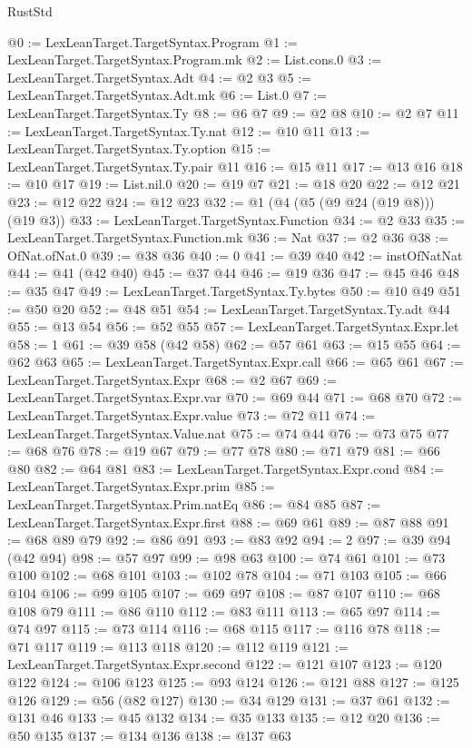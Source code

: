 \begin{lexlean}{RustStd}
\begin{coremodule}
{\begin{coremodule}
{{{{{{{{{{{{{{{{{{{{{{{{{{{{{{{{{@0 := LexLeanTarget.TargetSyntax.Program
@1 := LexLeanTarget.TargetSyntax.Program.mk
@2 := List.cons.{0}
@3 := LexLeanTarget.TargetSyntax.Adt
@4 := @2 @3
@5 := LexLeanTarget.TargetSyntax.Adt.mk
@6 := List.{0}
@7 := LexLeanTarget.TargetSyntax.Ty
@8 := @6 @7
@9 := @2 @8
@10 := @2 @7
@11 := LexLeanTarget.TargetSyntax.Ty.nat
@12 := @10 @11
@13 := LexLeanTarget.TargetSyntax.Ty.option
@15 := LexLeanTarget.TargetSyntax.Ty.pair @11
@16 := @15 @11
@17 := @13 @16
@18 := @10 @17
@19 := List.nil.{0}
@20 := @19 @7
@21 := @18 @20
@22 := @12 @21
@23 := @12 @22
@24 := @12 @23
@32 := @1 (@4 (@5 (@9 @24 (@19 @8))) (@19 @3))
@33 := LexLeanTarget.TargetSyntax.Function
@34 := @2 @33
@35 := LexLeanTarget.TargetSyntax.Function.mk
@36 := Nat
@37 := @2 @36
@38 := OfNat.ofNat.{0}
@39 := @38 @36
@40 := 0
@41 := @39 @40
@42 := instOfNatNat
@44 := @41 (@42 @40)
@45 := @37 @44
@46 := @19 @36
@47 := @45 @46
@48 := @35 @47
@49 := LexLeanTarget.TargetSyntax.Ty.bytes
@50 := @10 @49
@51 := @50 @20
@52 := @48 @51
@54 := LexLeanTarget.TargetSyntax.Ty.adt @44
@55 := @13 @54
@56 := @52 @55
@57 := LexLeanTarget.TargetSyntax.Expr.let
@58 := 1
@61 := @39 @58 (@42 @58)
@62 := @57 @61
@63 := @15 @55
@64 := @62 @63
@65 := LexLeanTarget.TargetSyntax.Expr.call
@66 := @65 @61
@67 := LexLeanTarget.TargetSyntax.Expr
@68 := @2 @67
@69 := LexLeanTarget.TargetSyntax.Expr.var
@70 := @69 @44
@71 := @68 @70
@72 := LexLeanTarget.TargetSyntax.Expr.value
@73 := @72 @11
@74 := LexLeanTarget.TargetSyntax.Value.nat
@75 := @74 @44
@76 := @73 @75
@77 := @68 @76
@78 := @19 @67
@79 := @77 @78
@80 := @71 @79
@81 := @66 @80
@82 := @64 @81
@83 := LexLeanTarget.TargetSyntax.Expr.cond
@84 := LexLeanTarget.TargetSyntax.Expr.prim
@85 := LexLeanTarget.TargetSyntax.Prim.natEq
@86 := @84 @85
@87 := LexLeanTarget.TargetSyntax.Expr.first
@88 := @69 @61
@89 := @87 @88
@91 := @68 @89 @79
@92 := @86 @91
@93 := @83 @92
@94 := 2
@97 := @39 @94 (@42 @94)
@98 := @57 @97
@99 := @98 @63
@100 := @74 @61
@101 := @73 @100
@102 := @68 @101
@103 := @102 @78
@104 := @71 @103
@105 := @66 @104
@106 := @99 @105
@107 := @69 @97
@108 := @87 @107
@110 := @68 @108 @79
@111 := @86 @110
@112 := @83 @111
@113 := @65 @97
@114 := @74 @97
@115 := @73 @114
@116 := @68 @115
@117 := @116 @78
@118 := @71 @117
@119 := @113 @118
@120 := @112 @119
@121 := LexLeanTarget.TargetSyntax.Expr.second
@122 := @121 @107
@123 := @120 @122
@124 := @106 @123
@125 := @93 @124
@126 := @121 @88
@127 := @125 @126
@129 := @56 (@82 @127)
@130 := @34 @129
@131 := @37 @61
@132 := @131 @46
@133 := @45 @132
@134 := @35 @133
@135 := @12 @20
@136 := @50 @135
@137 := @134 @136
@138 := @137 @63
}}}}}}}}}}}}}}}}}}}}}}}}}}}}}}}}}
\end{coremodule}}
\end{coremodule}
\end{lexlean}
